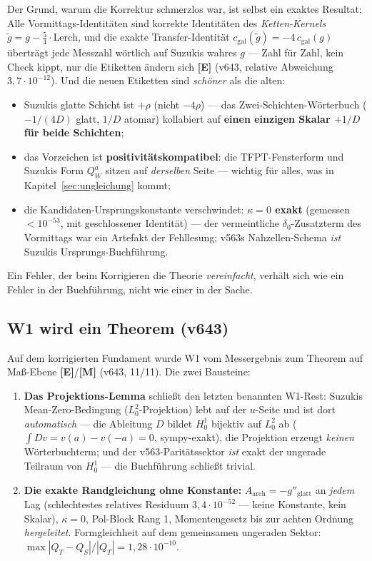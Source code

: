 \documentclass[11pt,a4paper]{article}
\newcommand{\E}{\textcolor{gut}{\textbf{[E]}}}
\newcommand{\M}{\textcolor{mess}{\textbf{[M]}}}
\begin{document}
Der Grund, warum die Korrektur schmerzlos war, ist selbst ein
exaktes Resultat: Alle Vormittags-Identitäten sind korrekte
Identitäten des \emph{Ketten-Kernels} $\tilde g = g - \tfrac54
\cdot \text{Lerch}$, und die exakte Transfer-Identität
$c_{\mathrm{gal}}(\tilde g) = -4\, c_{\mathrm{gal}}(g)$ überträgt
jede Messzahl wörtlich auf Suzukis wahres $g$ --- Zahl für Zahl,
kein Check kippt, nur die Etiketten ändern sich \E{} (v643, relative
Abweichung $3{,}7 \cdot 10^{-12}$). Und die neuen Etiketten sind
\emph{schöner} als die alten:

\begin{itemize}
\item Suzukis glatte Schicht ist $+\rho$ (nicht $-4\rho$) --- das
      Zwei-Schichten-Wörterbuch ($-1/(4D)$ glatt, $1/D$ atomar)
      kollabiert auf \textbf{einen einzigen Skalar $+1/D$ für beide
      Schichten};
\item das Vorzeichen ist \textbf{positivitätskompatibel}: die
      TFPT-Fensterform und Suzukis Form $Q_W^a$ sitzen auf
      \emph{derselben} Seite --- wichtig für alles, was in
      Kapitel~\ref{sec:ungleichung} kommt;
\item die Kandidaten-Ursprungskonstante verschwindet:
      \textbf{$\kappa = 0$ exakt} (gemessen $< 10^{-53}$, mit
      geschlossener Identität) --- der vermeintliche
      $\delta_0$-Zusatzterm des Vormittags war ein Artefakt der
      Fehllesung; v563s Nahzellen-Schema \emph{ist} Suzukis
      Ursprungs-Buchführung.
\end{itemize}

Ein Fehler, der beim Korrigieren die Theorie \emph{vereinfacht},
verhält sich wie ein Fehler in der Buchführung, nicht wie einer in
der Sache.

\subsection*{W1 wird ein Theorem (v643)}

Auf dem korrigierten Fundament wurde W1 vom Messergebnis zum
Theorem auf Maß-Ebene \E{}/\M{} (v643, 11/11). Die zwei Bausteine:

\begin{enumerate}
\item \textbf{Das Projektions-Lemma} schließt den letzten benannten
      W1-Rest: Suzukis Mean-Zero-Bedingung ($L^2_0$-Projektion)
      lebt auf der $u$-Seite und ist dort \emph{automatisch} ---
      die Ableitung $D$ bildet $H^1_0$ bijektiv auf $L^2_0$ ab
      ($\int Dv = v(a) - v(-a) = 0$, sympy-exakt), die Projektion
      erzeugt \emph{keinen} Wörterbuchterm; und der
      v563-Paritätssektor \emph{ist} exakt der ungerade Teilraum
      von $H^1_0$ --- die Buchführung schließt trivial.
\item \textbf{Die exakte Randgleichung ohne Konstante:}
      $A_{\mathrm{arch}} = -g''_{\mathrm{glatt}}$ an \emph{jedem}
      Lag (schlechtestes relatives Residuum $3{,}4 \cdot 10^{-52}$
      --- keine Konstante, kein Skalar), $\kappa = 0$, Pol-Block
      Rang 1, Momentengesetz bis zur achten Ordnung
      \emph{hergeleitet}. Formgleichheit auf dem gemeinsamen
      ungeraden Sektor: $\max |Q_T - Q_S| / |Q_T| =
      1{,}28 \cdot 10^{-10}$.
\end{enumerate}
\end{document}
